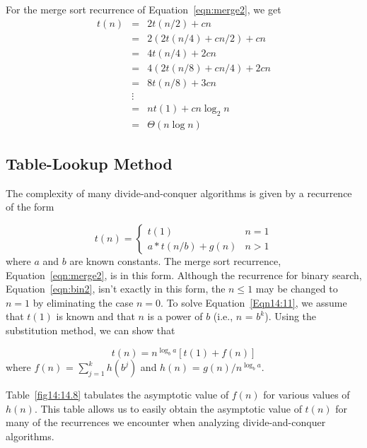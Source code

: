 For the merge sort recurrence of Equation~\ref{eqn:merge2}, we get
\begin{eqnarray*}
t(n) &=& 2t(n/2) + cn\\
&=& 2(2t(n/4) + cn/2) + cn\\
&=& 4t(n/4) + 2cn\\
&=& 4(2t(n/8) + cn/4) + 2cn\\
&=& 8t(n/8) + 3cn\\
&\vdots&\\
&=& nt(1) + cn\log_2 n\\
&=& \Theta(n \log n)
\end{eqnarray*}
\subsection{Table-Lookup Method}
The complexity of many divide-and-conquer algorithms is given by
a recurrence of the form

\begin{equation}\label{Eqn14:11}
t(n)  =  \left \{
            \begin{array}{ll}
         t(1) & n = 1\\
          a * t(n / b)+g(n) & n > 1
            \end{array}
         \right.
\end{equation}
where $a$ and $b$ are known constants.  The merge sort recurrence,
Equation~\ref{eqn:merge2}, is in this form. Although the recurrence for binary search,
Equation~\ref{eqn:bin2}, isn't exactly in this form, the $n \leq 1$ may be
changed to $n = 1$ by eliminating the case $n = 0$. 
To solve Equation~\ref{Eqn14:11}, we assume that $t(1)$ is known and
that $n$ is a power of $b$ (i.e., $n$ =
$b^k$).  
Using the substitution method, we can show that

\begin{equation}\label{Eqn14:13}
t(n) = n^{\log_b a} [t(1)+f(n)] 
\end{equation}
where $f(n)$ = $\sum_{j=1}^k h(b^j )$ and $h(n)$ =
$g(n) /  n^{\log_b a}$.
 
Table~\ref{fig14:14.8}
tabulates the asymptotic value of $f(n)$ for various values of
$h(n)$.  This table allows us to easily obtain
the asymptotic value of $t(n)$ for many of the
recurrences we encounter when analyzing divide-and-conquer algorithms.  


